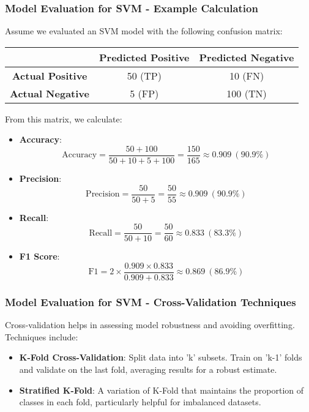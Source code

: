 \documentclass{beamer}
\begin{document}
\begin{frame}[fragile]
    \frametitle{Model Evaluation for SVM - Example Calculation}
    Assume we evaluated an SVM model with the following confusion matrix:

    \begin{center}
    \begin{tabular}{|c|c|c|}
        \hline
        & \textbf{Predicted Positive} & \textbf{Predicted Negative} \\
        \hline
        \textbf{Actual Positive} & 50 (TP) & 10 (FN) \\
        \hline
        \textbf{Actual Negative} & 5 (FP) & 100 (TN) \\
        \hline
    \end{tabular}
    \end{center}

    From this matrix, we calculate:
    
    \begin{itemize}
        \item \textbf{Accuracy}:  
        \[
        \text{Accuracy} = \frac{50 + 100}{50 + 10 + 5 + 100} = \frac{150}{165} \approx 0.909 \ (90.9\%)
        \]
        
        \item \textbf{Precision}:  
        \[
        \text{Precision} = \frac{50}{50 + 5} = \frac{50}{55} \approx 0.909 \ (90.9\%)
        \]
        
        \item \textbf{Recall}:  
        \[
        \text{Recall} = \frac{50}{50 + 10} = \frac{50}{60} \approx 0.833 \ (83.3\%)
        \]

        \item \textbf{F1 Score}:  
        \[
        \text{F1} = 2 \times \frac{0.909 \times 0.833}{0.909 + 0.833} \approx 0.869 \ (86.9\%)
        \]
    \end{itemize}
\end{frame}

\begin{frame}[fragile]
    \frametitle{Model Evaluation for SVM - Cross-Validation Techniques}
    Cross-validation helps in assessing model robustness and avoiding overfitting. Techniques include:
    
    \begin{itemize}
        \item \textbf{K-Fold Cross-Validation}: Split data into 'k' subsets. Train on 'k-1' folds and validate on the last fold, averaging results for a robust estimate.
        
        \item \textbf{Stratified K-Fold}: A variation of K-Fold that maintains the proportion of classes in each fold, particularly helpful for imbalanced datasets.
    \end{itemize}
\end{frame}
\end{document}
